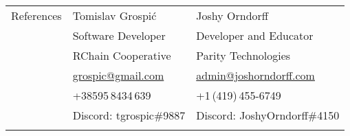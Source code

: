 \documentclass[letterpaper,10pt,oneside]{article}
\begin{document}
\vfill



\noindent \begin{tabular}{@{} l l l}
 \Large{References} & Tomislav Grospi\'{c} & \hspace{.5in} Joshy Orndorff \\
 \hspace{1.1in} & Software Developer & \hspace{.5in} Developer and Educator \\
 & RChain Cooperative & \hspace{.5in} Parity Technologies \\
 & \small{\href{mailto:grospic@gmail.com}{grospic@gmail.com}} &  \hspace{.5in} \small{\href{mailto:admin@joshorndorff.com}{admin@joshorndorff.com}} \\
 & \small{+38595\,8434\,639} & \hspace{.5in} \small{+1\,(419)\,455-6749} \\
 & \small{Discord: tgrospic\#9887} & \hspace{.5in} \small{Discord: JoshyOrndorff\#4150} \\
&& \\

\end{tabular}
\end{document}
